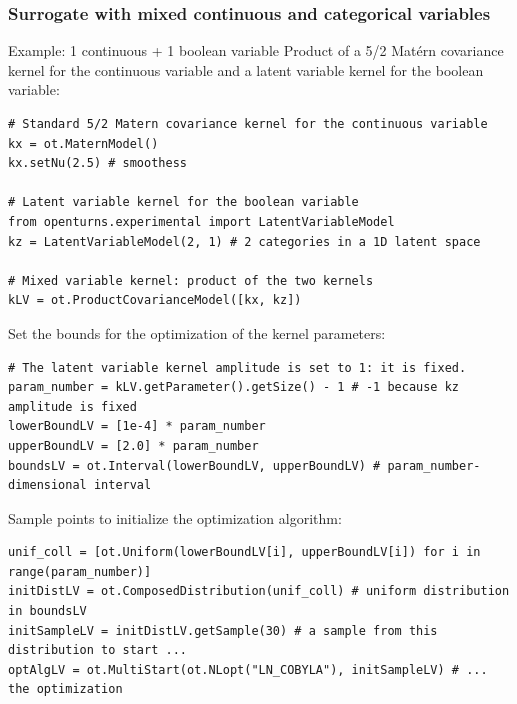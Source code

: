 \documentclass{beamer}
\begin{document}

\begin{frame}[containsverbatim]
\frametitle{Surrogate with mixed continuous and categorical variables}
\small
\begin{block}{Example: 1 continuous + 1 boolean variable}
Product of a 5/2 Mat\'ern covariance kernel for the continuous variable and a latent variable kernel for the boolean variable:

\begin{lstlisting}
# Standard 5/2 Matern covariance kernel for the continuous variable
kx = ot.MaternModel()
kx.setNu(2.5) # smoothess

# Latent variable kernel for the boolean variable
from openturns.experimental import LatentVariableModel
kz = LatentVariableModel(2, 1) # 2 categories in a 1D latent space

# Mixed variable kernel: product of the two kernels
kLV = ot.ProductCovarianceModel([kx, kz])
\end{lstlisting}

Set the bounds for the optimization of the kernel parameters:

\begin{lstlisting}
# The latent variable kernel amplitude is set to 1: it is fixed.
param_number = kLV.getParameter().getSize() - 1 # -1 because kz amplitude is fixed
lowerBoundLV = [1e-4] * param_number
upperBoundLV = [2.0] * param_number
boundsLV = ot.Interval(lowerBoundLV, upperBoundLV) # param_number-dimensional interval
\end{lstlisting}

Sample points to initialize the optimization algorithm:
\begin{lstlisting}
unif_coll = [ot.Uniform(lowerBoundLV[i], upperBoundLV[i]) for i in range(param_number)]
initDistLV = ot.ComposedDistribution(unif_coll) # uniform distribution in boundsLV
initSampleLV = initDistLV.getSample(30) # a sample from this distribution to start ...
optAlgLV = ot.MultiStart(ot.NLopt("LN_COBYLA"), initSampleLV) # ... the optimization
\end{lstlisting}

\end{block}
\end{frame}

\end{document}
